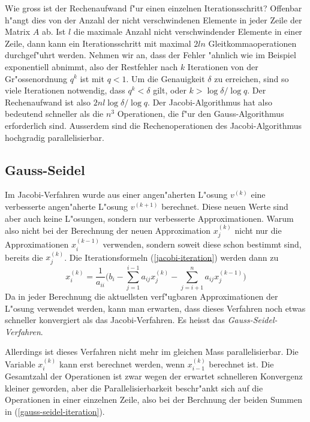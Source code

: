 Wie gross ist der Rechenaufwand f"ur einen einzelnen Iterationsschritt?
Offenbar h"angt dies von der Anzahl der nicht verschwindenen Elemente 
in jeder Zeile der Matrix $A$ ab.
Ist $l$ die maximale Anzahl nicht verschwindender Elemente in einer Zeile,
dann kann ein Iterationsschritt mit maximal $2ln$ Gleitkommaoperationen
durchgef"uhrt werden. Nehmen wir an, dass der Fehler "ahnlich wie im Beispiel
exponentiell abnimmt, also der Restfehler nach $k$ Iterationen von der
Gr"ossenordnung $q^k$ ist mit $q<1$.
Um die Genauigkeit $\delta$ zu erreichen, sind so viele Iterationen notwendig,
dass $q^k < \delta$ gilt, oder $k>\log \delta/\log q$.
Der Rechenaufwand ist also $2nl\log\delta/\log q$.
Der Jacobi-Algorithmus hat also bedeutend schneller als die $n^3$ 
Operationen, die f"ur den Gauss-Algorithmus erforderlich sind.
Ausserdem sind die Rechenoperationen des Jacobi-Algorithmus hochgradig
parallelisierbar.

\subsection{Gauss-Seidel\label{section-gauss-seidel}}
Im Jacobi-Verfahren wurde aus einer angen"aherten L"osung $v^{(k)}$
eine verbesserte angen"aherte L"osung $v^{(k+1)}$ berechnet.
Diese neuen Werte sind aber auch keine L"osungen, sondern nur verbesserte
Approximationen.
Warum also nicht bei der Berechnung der neuen Approximation $x_j^{(k)}$
nicht nur die Approximationen $x_i^{(k-1)}$ verwenden, sondern soweit
diese schon bestimmt sind, bereits die $x_j^{(k)}$.
Die Iterationsformeln (\ref{jacobi-iteration}) werden dann zu
\begin{equation}
x_i^{(k)}=\frac1{a_{ii}}\biggl(b_i
-\sum_{j=1}^{i-1}a_{ij}x_j^{(k)}
-\sum_{j=i+1}^na_{ij}x_j^{(k-1)}
\biggr)
\label{gauss-seidel-iteration}
\end{equation}
Da in jeder Berechnung die aktuellsten verf"ugbaren Approximationen der
L"osung verwendet werden, kann man erwarten, dass dieses Verfahren
noch etwas schneller konvergiert als das Jacobi-Verfahren.
Es heisst das {\em Gauss-Seidel-Verfahren}.

Allerdings ist dieses Verfahren nicht mehr im gleichen Mass parallelisierbar.
Die Variable $x_i^{(k)}$ kann erst berechnet werden, wenn $x_{i-1}^{(k)}$
berechnet ist. Die Gesamtzahl der Operationen ist zwar wegen der erwartet
schnelleren Konvergenz kleiner geworden, aber die Parallelisierbarkeit
beschr"ankt sich auf die Operationen in einer einzelnen Zeile, also
bei der Berchnung der beiden Summen in (\ref{gauss-seidel-iteration}).

